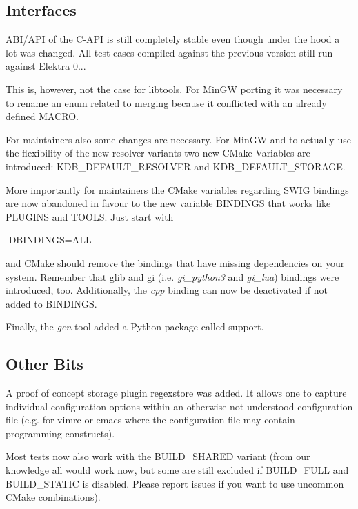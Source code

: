 \subsection*{Interfaces}

A\+B\+I/\+A\+PI of the C-\/\+A\+PI is still completely stable even though under the hood a lot was changed. All test cases compiled against the previous version still run against Elektra 0...

This is, however, not the case for libtools. For Min\+GW porting it was necessary to rename an enum related to merging because it conflicted with an already defined M\+A\+C\+RO.

For maintainers also some changes are necessary. For Min\+GW and to actually use the flexibility of the new resolver variants two new C\+Make Variables are introduced\+: K\+D\+B\+\_\+\+D\+E\+F\+A\+U\+L\+T\+\_\+\+R\+E\+S\+O\+L\+V\+ER and K\+D\+B\+\_\+\+D\+E\+F\+A\+U\+L\+T\+\_\+\+S\+T\+O\+R\+A\+GE.

More importantly for maintainers the C\+Make variables regarding S\+W\+IG bindings are now abandoned in favour to the new variable B\+I\+N\+D\+I\+N\+GS that works like P\+L\+U\+G\+I\+NS and T\+O\+O\+LS. Just start with


\begin{DoxyCode}
-DBINDINGS=ALL
\end{DoxyCode}


and C\+Make should remove the bindings that have missing dependencies on your system. Remember that glib and gi (i.\+e. {\itshape gi\+\_\+python3} and {\itshape gi\+\_\+lua}) bindings were introduced, too. Additionally, the {\itshape cpp} binding can now be deactivated if not added to B\+I\+N\+D\+I\+N\+GS.

Finally, the {\itshape gen} tool added a Python package called {\ttfamily support}.

\subsection*{Other Bits}

A proof of concept storage plugin {\ttfamily regexstore} was added. It allows one to capture individual configuration options within an otherwise not understood configuration file (e.\+g. for vimrc or emacs where the configuration file may contain programming constructs).

Most tests now also work with the B\+U\+I\+L\+D\+\_\+\+S\+H\+A\+R\+ED variant (from our knowledge all would work now, but some are still excluded if B\+U\+I\+L\+D\+\_\+\+F\+U\+LL and B\+U\+I\+L\+D\+\_\+\+S\+T\+A\+T\+IC is disabled. Please report issues if you want to use uncommon C\+Make combinations).

